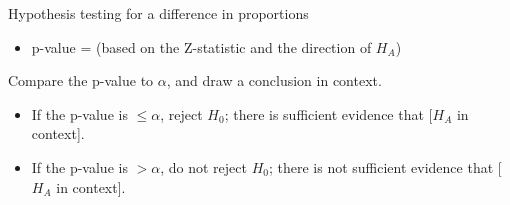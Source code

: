 \begin{onebox}{Hypothesis testing for a difference in proportions}
\begin{itemize}
\begin{itemize}
\item[] null value: 0
\item[] $SE$ of estimate: $\sqrt{\hat{p}_c(1-\hat{p}_c)\left(\frac{1}{n_1} + \frac{1}{n_2} \right)}$, where $\hat{p}_c$ is the pooled proportion
\end{itemize}
\item[] p-value = (based on the Z-statistic and the direction of $H_A$)
\end{itemize}
  Compare the p-value to $\alpha$, and draw a conclusion in context.\vspace{-1mm}
\begin{itemize}
\item[] If the p-value is $\le \alpha$, reject $H_0$; there is sufficient evidence that [$H_A$ in context]. 
\item[] If the p-value is $> \alpha$, do not reject $H_0$; there is not sufficient evidence that [$H_A$ in context].
\end{itemize}\end{onebox}


